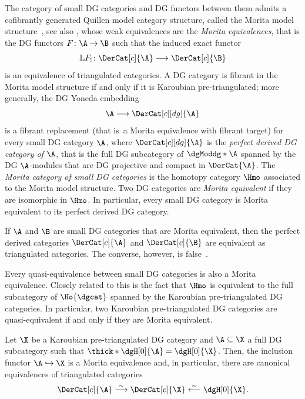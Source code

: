 \documentclass[a4paper]{amsart}
\begin{document}
The category of small DG categories and DG functors between them admits a
cofibrantly generated Quillen model category structure, called the Morita model
structure~\cite[Thm.~5.3]{Tab05}, see also
\cite{tabuada_2006_addendum_invariants_additifs,tabuada_2007_corrections_invariants_additifs},
whose weak equivalences are the \emph{Morita equivalences}, that is the DG
functors $F\colon\A\to\B$ such that the induced exact functor
\[
  \mathbb{L}F_!\colon\DerCat[c]{\A}\longrightarrow\DerCat[c]{\B}
\]
is an equivalence of triangulated categories. A DG category is fibrant in the
Morita model structure if and only if it is Karoubian pre-triangulated; more
generally, the DG Yoneda embedding
\[
  \A\longrightarrow\DerCat[c][dg]{\A}
\]
is a fibrant replacement (that is~a Morita equivalence with fibrant target) for
every small DG category $\A$, where $\DerCat[c][dg]{\A}$ is the \emph{perfect
  derived DG category of $\A$}, that is the full DG subcategory of
$\dgModdg*{\A}$ spanned by the DG $\A$-modules that are DG projective and
compact in $\DerCat{\A}$. The \emph{Morita category of small DG categories} is
the homotopy category $\Hmo$ associated to the Morita model structure. Two DG
categories are \emph{Morita equivalent} if they are isomorphic in $\Hmo$. In
particular, every small DG category is Morita equivalent to its perfect derived
DG category.

\begin{remark}
  If $\A$ and $\B$ are small DG categories that are Morita equivalent, then the
  perfect derived categories $\DerCat[c]{\A}$ and $\DerCat[c]{\B}$ are
  equivalent as triangulated categories. The converse, however, is
  false~\cite{DS07,Sch02,Kaj13,RVdB19}.
\end{remark}

\begin{remark}
  \label{rmk:quasi-equivalence_vs_Morita_equivalence}
  Every quasi-equivalence between small DG categories is also a Morita
  equivalence. Closely related to this is the fact that $\Hmo$ is equivalent to
  the full subcategory of $\Ho{\dgcat}$ spanned by the Karoubian
  pre-triangulated DG categories. In particular, two Karoubian pre-triangulated
  DG categories are quasi-equivalent if and only if they are Morita equivalent.
\end{remark}

\begin{theorem}
  \label{thm:Keller-perf}
  Let $\X$ be a Karoubian pre-triangulated DG category and $\A\subseteq\X$ a
  full DG subcategory such that $\thick*{\dgH[0]{\A}}=\dgH[0]{\X}$. Then, the
  inclusion functor $\A\hookrightarrow\X$ is a Morita equivalence and, in
  particular, there are canonical equivalences of triangulated categories
  \[
    \DerCat[c]{\A}\stackrel{\sim}{\longrightarrow}\DerCat[c]{\X}\stackrel{\sim}{\longleftarrow}\dgH[0]{\X}.
  \]
\end{theorem}
\end{document}
